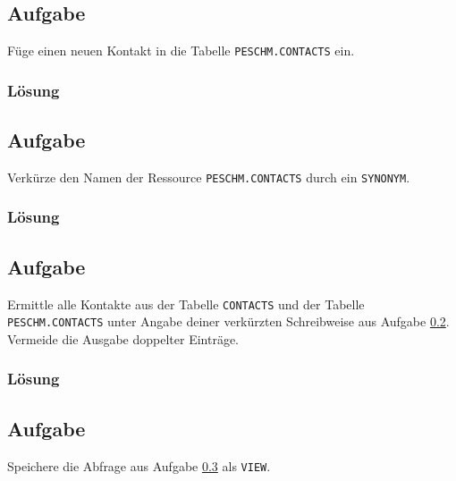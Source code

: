\subsection{Aufgabe}
\label{sec:uebung_03.aufgabe_03}
Füge einen neuen Kontakt in die Tabelle \texttt{PESCHM.CONTACTS} ein.

\subsubsection*{Lösung}
\label{sec:uebung_03.aufgabe_03.loesung}

\subsection{Aufgabe}
\label{sec:uebung_03.aufgabe_04}
Verkürze den Namen der Ressource \texttt{PESCHM.CONTACTS} durch ein \texttt{SYNONYM}.

\subsubsection*{Lösung}
\label{sec:uebung_03.aufgabe_04.loesung}

\subsection{Aufgabe}
\label{sec:uebung_03.aufgabe_05}
Ermittle alle Kontakte aus der Tabelle \texttt{CONTACTS} und der Tabelle \texttt{PESCHM.CONTACTS} unter Angabe deiner verkürzten Schreibweise aus Aufgabe \ref{sec:uebung_03.aufgabe_04}. Vermeide die Ausgabe doppelter Einträge.

\subsubsection*{Lösung}
\label{sec:uebung_03.aufgabe_05.loesung}

\subsection{Aufgabe}
\label{sec:uebung_03.aufgabe_06}
Speichere die Abfrage aus Aufgabe \ref{sec:uebung_03.aufgabe_05} als \texttt{VIEW}.

